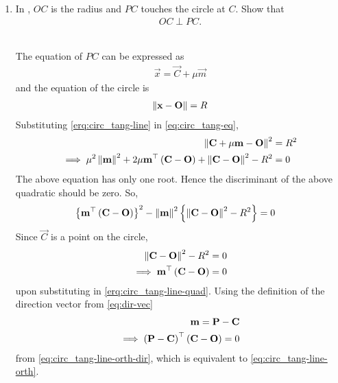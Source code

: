 %
\begin{enumerate}[label=\thesection.\arabic*.,ref=\thesection.\theenumi]
\item 
		In ,  $OC$ is the radius and $PC$ touches the circle at $C$.  Show that	
  \begin{align}
	  OC \perp PC.
		\label{eq:circ_tang-line-orth}	
  \end{align}
	\begin{figure}[!ht]
		\begin{center}
			
			\resizebox{\columnwidth}{!}{}
		\end{center}
		\caption{}
		\label{fig:circ_tang}	
	\end{figure}
	\\
		\solution
		The equation of $PC$ can be expressed as
  \begin{align}
		\label{erq:circ_tang-line}	
	  \vec{x} = 
	  \vec{C} + \mu\vec{m}
  \end{align}
  and the equation of the circle is 
  \begin{align}
		\label{eq:circ_tang-eq}	
	  \norm{\vec{x}-\vec{O}} = R
  \end{align}
  Substituting
		\eqref{erq:circ_tang-line}	
		in 
		\eqref{eq:circ_tang-eq},
  \begin{align}
	  \left\lVert\mathbf{C} + \mu\mathbf{m}- \mathbf{O}\right\rVert^2 &= R^2
	  \\
	  \implies	  \mu^2 \left\lVert \mathbf{m}\right\rVert^2 
	  + 2\mu\mathbf{m}^{\top}\left(\mathbf{C} -\mathbf{O}\right)
	  + \left\lVert\mathbf{C}-\mathbf{O}\right\rVert^2 - R^2 &= 0
  \end{align}
  The above equation has only one root.  Hence the discriminant of the above quadratic should be zero. So, 
  \begin{align}
	  \cbrak{\vec{m}^{\top}\brak{\vec{C} -\vec{O}}}^2-\norm{ \vec{m}}^2 
	  \cbrak{ \norm{\vec{C}-\vec{O}}^2 - R^2} &= 0
		\label{erq:circ_tang-line-quad}	
  \end{align}
  Since $\vec{C}$ is a point on the circle, 
  \begin{align}
	   \norm{\vec{C}-\vec{O}}^2 - R^2 = 0
	   \\
	   \implies 
	  \vec{m}^{\top}\brak{\vec{C} -\vec{O}} = 0
		\label{eq:circ_tang-line-orth-dir}	
  \end{align}
upon substituting in \eqref{erq:circ_tang-line-quad}. Using the definition of the direction vector from 	
\eqref{eq:dir-vec}
  \begin{align}
	  \mathbf{m}=\mathbf{P}-\mathbf{C} 
	\\
	  \implies 
	  \left(\mathbf{P}-\mathbf{C}\right)^{\top}\left(\mathbf{C} -\mathbf{O}\right) = 0
  \end{align}
		from \eqref{eq:circ_tang-line-orth-dir},	
		which is equivalent to 
		\eqref{eq:circ_tang-line-orth}.


\end{enumerate}

